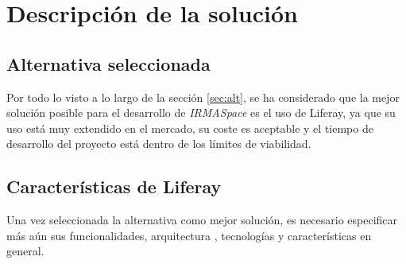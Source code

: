 \section{Descripción de la solución}\label{sec:solution}


\subsection{Alternativa seleccionada}
\par Por todo lo visto a lo largo de la sección \ref{sec:alt}, se ha considerado que la mejor solución posible para el desarrollo de \textit{IRMASpace} es el uso de Liferay, ya que su uso está muy extendido en el mercado, su coste es aceptable y el tiempo de desarrollo del proyecto está dentro de los límites de viabilidad.

\subsection{Características de Liferay}
\par Una vez seleccionada la alternativa como mejor solución, es necesario especificar más aún sus funcionalidades, arquitectura , tecnologías y características en general.

